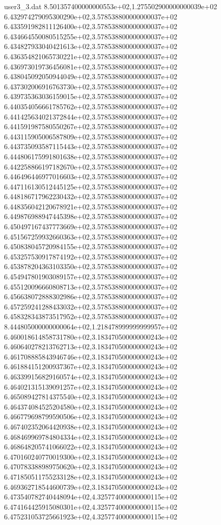 \begin{filecontents}{user3_3.dat}
8.501357400000000553e+02,1.275502900000000039e+02
6.432974279095300290e+02,3.578538800000000037e+02
6.433591982811126400e+02,3.578538800000000037e+02
6.434664550080515255e+02,3.578538800000000037e+02
6.434827933040421613e+02,3.578538800000000037e+02
6.436354821065730221e+02,3.578538800000000037e+02
6.436973019736456081e+02,3.578538800000000037e+02
6.438045092050944049e+02,3.578538800000000037e+02
6.437302006916763730e+02,3.578538800000000037e+02
6.439735363036159015e+02,3.578538800000000037e+02
6.440354056661785762e+02,3.578538800000000037e+02
6.441425634021372844e+02,3.578538800000000037e+02
6.441591987580550267e+02,3.578538800000000037e+02
6.443115905006587809e+02,3.578538800000000037e+02
6.443735093587115443e+02,3.578538800000000037e+02
6.444806175991801638e+02,3.578538800000000037e+02
6.442258866197182670e+02,3.578538800000000037e+02
6.446496446977016603e+02,3.578538800000000037e+02
6.447116130512445125e+02,3.578538800000000037e+02
6.448186717962230432e+02,3.578538800000000037e+02
6.448356042120678921e+02,3.578538800000000037e+02
6.449876988947445398e+02,3.578538800000000037e+02
6.450497167437773669e+02,3.578538800000000037e+02
6.451567259932660363e+02,3.578538800000000037e+02
6.450838045720984155e+02,3.578538800000000037e+02
6.453257530917874192e+02,3.578538800000000037e+02
6.453878204363103350e+02,3.578538800000000037e+02
6.454947801903089157e+02,3.578538800000000037e+02
6.455120096660808713e+02,3.578538800000000037e+02
6.456638072888302986e+02,3.578538800000000037e+02
6.457259241288433032e+02,3.578538800000000037e+02
6.458328343873517952e+02,3.578538800000000037e+02
8.444805000000000064e+02,1.218478999999999957e+02
6.460018614858731780e+02,3.183470500000000243e+02
6.460640278213762713e+02,3.183470500000000243e+02
6.461708885843946746e+02,3.183470500000000243e+02
6.461884151200937367e+02,3.183470500000000243e+02
6.463399156829160574e+02,3.183470500000000243e+02
6.464021315139091257e+02,3.183470500000000243e+02
6.465089427814375540e+02,3.183470500000000243e+02
6.464374084525204580e+02,3.183470500000000243e+02
6.466779698799590506e+02,3.183470500000000243e+02
6.467402352064420938e+02,3.183470500000000243e+02
6.468469969784804334e+02,3.183470500000000243e+02
6.468648205741066022e+02,3.183470500000000243e+02
6.470160240770019300e+02,3.183470500000000243e+02
6.470783388989750620e+02,3.183470500000000243e+02
6.471850511755233128e+02,3.183470500000000243e+02
6.469362718544600739e+02,3.183470500000000243e+02
6.473540782740448094e+02,4.325774000000000115e+02
6.474164425915080301e+02,4.325774000000000115e+02
6.475231053725661923e+02,4.325774000000000115e+02

\end{filecontents}
